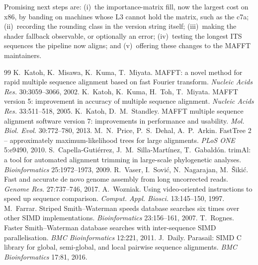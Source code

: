 \documentclass[11pt]{article}
\begin{document}
Promising next steps are:
(i)~the importance-matrix fill, now the largest cost on x86, by banding on machines whose L3
cannot hold the matrix, such as the c7a;
(ii)~recording the rounding class in the version string itself;
(iii)~making the shader fallback observable, or optionally an error;
(iv)~testing the longest ITS sequences the pipeline now aligns;
and (v)~offering these changes to the MAFFT maintainers.

\begin{thebibliography}{99}\small
{} K.~Katoh, K.~Misawa, K.~Kuma, T.~Miyata. MAFFT: a novel method for
  rapid multiple sequence alignment based on fast Fourier transform.
  \emph{Nucleic Acids Res.} 30:3059--3066, 2002.
 K.~Katoh, K.~Kuma, H.~Toh, T.~Miyata. MAFFT version 5: improvement in
  accuracy of multiple sequence alignment. \emph{Nucleic Acids Res.} 33:511--518, 2005.
 K.~Katoh, D.~M.~Standley. MAFFT multiple sequence alignment software
  version 7: improvements in performance and usability. \emph{Mol. Biol. Evol.}
  30:772--780, 2013.
 M.~N.~Price, P.~S.~Dehal, A.~P.~Arkin. FastTree 2 -- approximately
  maximum-likelihood trees for large alignments. \emph{PLoS ONE} 5:e9490, 2010.
 S.~Capella-Guti\'errez, J.~M.~Silla-Mart\'inez, T.~Gabald\'on.
  trimAl: a tool for automated alignment trimming in large-scale phylogenetic analyses.
  \emph{Bioinformatics} 25:1972--1973, 2009.
 R.~Vaser, I.~Sovi\'c, N.~Nagarajan, M.~\v{S}iki\'c. Fast and accurate
  de novo genome assembly from long uncorrected reads. \emph{Genome Res.} 27:737--746,
  2017.
 A.~Wozniak. Using video-oriented instructions to speed up sequence
  comparison. \emph{Comput. Appl. Biosci.} 13:145--150, 1997.
 M.~Farrar. Striped Smith--Waterman speeds database searches six times
  over other SIMD implementations. \emph{Bioinformatics} 23:156--161, 2007.
 T.~Rognes. Faster Smith--Waterman database searches with
  inter-sequence SIMD parallelisation. \emph{BMC Bioinformatics} 12:221, 2011.
 J.~Daily. Parasail: SIMD C library for global, semi-global, and local
  pairwise sequence alignments. \emph{BMC Bioinformatics} 17:81, 2016.
\end{thebibliography}
\end{document}
